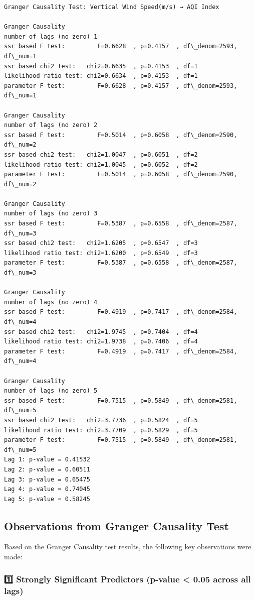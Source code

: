 \documentclass[11pt]{article}
\begin{document}
\begin{Verbatim}[commandchars=\\\{\}]
Granger Causality Test: Vertical Wind Speed(m/s) → AQI Index

Granger Causality
number of lags (no zero) 1
ssr based F test:         F=0.6628  , p=0.4157  , df\_denom=2593, df\_num=1
ssr based chi2 test:   chi2=0.6635  , p=0.4153  , df=1
likelihood ratio test: chi2=0.6634  , p=0.4153  , df=1
parameter F test:         F=0.6628  , p=0.4157  , df\_denom=2593, df\_num=1

Granger Causality
number of lags (no zero) 2
ssr based F test:         F=0.5014  , p=0.6058  , df\_denom=2590, df\_num=2
ssr based chi2 test:   chi2=1.0047  , p=0.6051  , df=2
likelihood ratio test: chi2=1.0045  , p=0.6052  , df=2
parameter F test:         F=0.5014  , p=0.6058  , df\_denom=2590, df\_num=2

Granger Causality
number of lags (no zero) 3
ssr based F test:         F=0.5387  , p=0.6558  , df\_denom=2587, df\_num=3
ssr based chi2 test:   chi2=1.6205  , p=0.6547  , df=3
likelihood ratio test: chi2=1.6200  , p=0.6549  , df=3
parameter F test:         F=0.5387  , p=0.6558  , df\_denom=2587, df\_num=3

Granger Causality
number of lags (no zero) 4
ssr based F test:         F=0.4919  , p=0.7417  , df\_denom=2584, df\_num=4
ssr based chi2 test:   chi2=1.9745  , p=0.7404  , df=4
likelihood ratio test: chi2=1.9738  , p=0.7406  , df=4
parameter F test:         F=0.4919  , p=0.7417  , df\_denom=2584, df\_num=4

Granger Causality
number of lags (no zero) 5
ssr based F test:         F=0.7515  , p=0.5849  , df\_denom=2581, df\_num=5
ssr based chi2 test:   chi2=3.7736  , p=0.5824  , df=5
likelihood ratio test: chi2=3.7709  , p=0.5829  , df=5
parameter F test:         F=0.7515  , p=0.5849  , df\_denom=2581, df\_num=5
Lag 1: p-value = 0.41532
Lag 2: p-value = 0.60511
Lag 3: p-value = 0.65475
Lag 4: p-value = 0.74045
Lag 5: p-value = 0.58245
    \end{Verbatim}

    \hypertarget{observations-from-granger-causality-test}{%
\subsection{\texorpdfstring{\textbf{Observations from Granger Causality
Test}}{Observations from Granger Causality Test}}\label{observations-from-granger-causality-test}}

Based on the Granger Causality test results, the following key
observations were made:

\hypertarget{strongly-significant-predictors-p-value-0.05-across-all-lags}{%
\subsubsection{\texorpdfstring{\textbf{1️⃣ Strongly Significant
Predictors (p-value \textless{} 0.05 across all
lags)}}{1️⃣ Strongly Significant Predictors (p-value \textless{} 0.05 across all lags)}}\label{strongly-significant-predictors-p-value-0.05-across-all-lags}}
\end{document}

